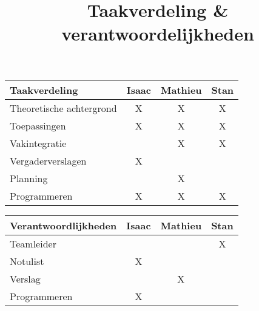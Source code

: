 \documentclass{article}
\title{Taakverdeling \& verantwoordelijkheden}
\begin{document}
	\maketitle
	\begin{center}
		\begin{tabular}{ l |c| c |c }
			Taakverdeling & Isaac & Mathieu & Stan \\ 
            \hline\hline
			Theoretische achtergrond & X & X & X\\  
			\hline
			Toepassingen & X & X & X\\  
			\hline
			Vakintegratie &  & X & X\\  
			\hline
			Vergaderverslagen & X &  & \\
			\hline
			Planning &  & X & \\
			\hline
			Programmeren & X & X & X
		\end{tabular}
	\end{center}
	\begin{center}
		\begin{tabular}{ l |c| c |c }
			Verantwoordlijkheden& Isaac & Mathieu & Stan \\ 
			\hline\hline
			Teamleider &  &  & X\\  
			\hline
			Notulist & X &  & \\  
			\hline
			Verslag &  & X & \\  
			\hline
			Programmeren & X &  & \\
		\end{tabular}
	\end{center}
\end{document}
